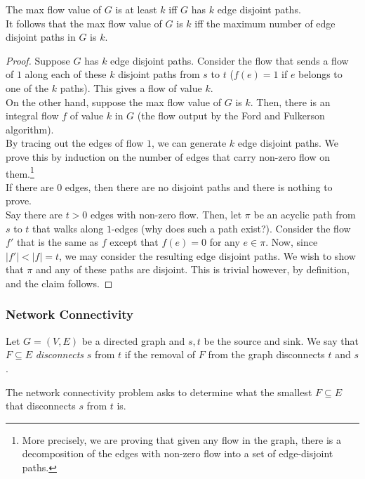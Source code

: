 \begin{lemma}
	\label{edge disjoint paths}
	The max flow value of $G$ is at least $k$ iff $G$ has $k$ edge disjoint paths.\\
	It follows that the max flow value of $G$ is $k$ iff the maximum number of edge disjoint paths in $G$ is $k$.
\end{lemma}
\begin{proof}
	Suppose $G$ has $k$ edge disjoint paths. Consider the flow that sends a flow of $1$ along each of these $k$ disjoint paths from $s$ to $t$ ($f(e)=1$ if $e$ belongs to one of the $k$ paths). This gives a flow of value $k$.\\

	On the other hand, suppose the max flow value of $G$ is $k$. Then, there is an integral flow $f$ of value $k$ in $G$ (the flow output by the Ford and Fulkerson algorithm).\\
	By tracing out the edges of flow $1$, we can generate $k$ edge disjoint paths. We prove this by induction on the number of edges that carry non-zero flow on them.\footnote{More precisely, we are proving that given any flow in the graph, there is a decomposition of the edges with non-zero flow into a set of edge-disjoint paths.}\\
	If there are $0$ edges, then there are no disjoint paths and there is nothing to prove.\\
	Say there are $t>0$ edges with non-zero flow. Then, let $\pi$ be an acyclic path from $s$ to $t$ that walks along $1$-edges (why does such a path exist?). Consider the flow $f'$ that is the same as $f$ except that $f(e)=0$ for any $e\in\pi$. Now, since $|f'|<|f|=t$, we may consider the resulting edge disjoint paths. We wish to show that $\pi$ and any of these paths are disjoint. This is trivial however, by definition, and the claim follows.
\end{proof}

\subsubsection{Network Connectivity}

Let $G=(V,E)$ be a directed graph and $s,t$ be the source and sink. We say that $F\subseteq E$ \textit{disconnects} $s$ from $t$ if the removal of $F$ from the graph disconnects $t$ and $s$.

The network connectivity problem asks to determine what the smallest $F\subseteq E$ that disconnects $s$ from $t$ is.


